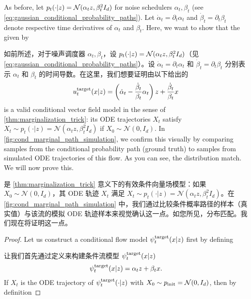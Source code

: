 \begin{examplebox}
As before, let $p_t(\cdot|z) = \mathcal{N}(\alpha_t z,\beta_t^2 I_d)$ for noise schedulers $\alpha_t,\beta_t$ (see \cref{eq:gaussian_conditional_probability_paths}). Let $\dot{\alpha}_t=\partial_t\alpha_t$ and $\dot{\beta}_t=\partial_t\beta_t$ denote respective time derivatives of $\alpha_t$ and $\beta_t$. Here, we want to show that the  given by

如前所述，对于噪声调度器 $\alpha_t,\beta_t$，设 $p_t(\cdot|z) = \mathcal{N}(\alpha_t z,\beta_t^2 I_d)$（见 \cref{eq:gaussian_conditional_probability_paths}）。设 $\dot{\alpha}_t=\partial_t\alpha_t$ 和 $\dot{\beta}_t=\partial_t\beta_t$ 分别表示 $\alpha_t$ 和 $\beta_t$ 的时间导数。在这里，我们想要证明由以下给出的 
\begin{align}
\label{eq:conditional_gaussian_vf}
    u^{\text{target}}_t(x|z) = \left(\dot{\alpha}_t-\frac{\dot{\beta}_t}{\beta_t}\alpha_t\right)z+\frac{\dot{\beta}_t}{\beta_t}x
\end{align}
is a valid conditional vector field model in the sense of \cref{thm:marginalization_trick}: its ODE trajectories $X_t$ satisfy $X_t\sim p_t(\cdot|z)=\mathcal{N}(\alpha_t z,\beta_t^2I_d)$ if $X_0\sim \mathcal{N}(0,I_d)$. In \cref{fig:cond_marginal_path_simulation}, we confirm this visually by comparing samples from the conditional probability path (ground truth) to samples from simulated ODE trajectories of this flow. As you can see, the distribution match. We will now prove this.

是 \cref{thm:marginalization_trick} 意义下的有效条件向量场模型：如果 $X_0\sim \mathcal{N}(0,I_d)$，其 ODE 轨迹 $X_t$ 满足 $X_t\sim p_t(\cdot|z)=\mathcal{N}(\alpha_t z,\beta_t^2I_d)$。在 \cref{fig:cond_marginal_path_simulation} 中，我们通过比较条件概率路径的样本（真实值）与该流的模拟 ODE 轨迹样本来视觉确认这一点。如您所见，分布匹配。我们现在将证明这一点。

\begin{proof}
Let us construct a conditional flow model $\psi^{\text{target}}_t(x|z)$ first by defining

让我们首先通过定义来构建条件流模型 $\psi^{\text{target}}_t(x|z)$
\begin{align}
    \label{eq:cond_flow_gaussian}
    \psi^{\text{target}}_t(x|z) = \alpha_t z + \beta_t x.
\end{align}
If $X_t$ is the ODE trajectory of $\psi^{\text{target}}_t(\cdot|z)$ with $X_0\sim p_{\rm{init}} = \mathcal{N}(0,I_d)$, then by definition


\end{proof}
\end{examplebox}
